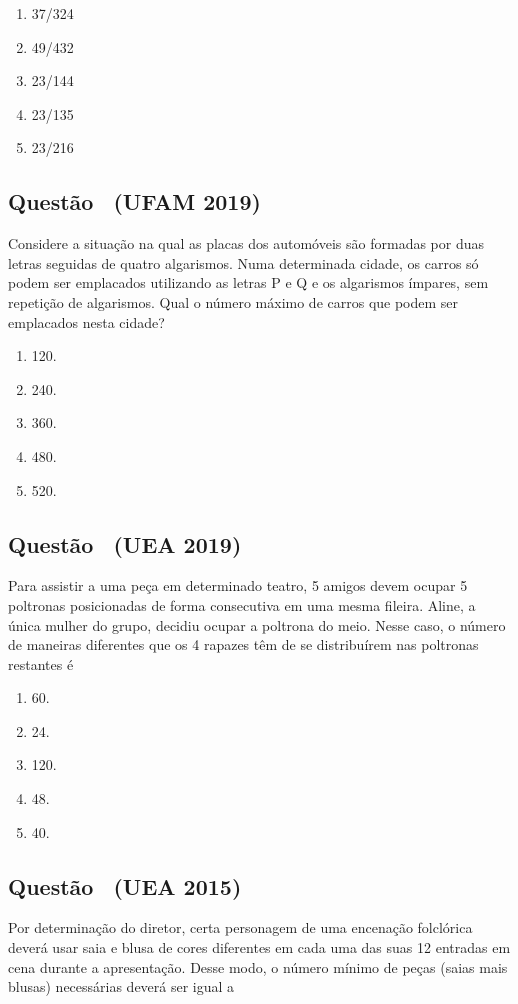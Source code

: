 \documentclass[12pt]{article}
\newcounter{questao}
\newcommand{\novaquestao}[1]{%
	\stepcounter{questao}%
	\subsection*{Questão \thequestao\ (#1)}%
}
\begin{document}
\begin{multicols}{2}
			\begin{enumerate}[label=(\alph*), noitemsep]
				\item {37}/{324}
				\item {49}/{432}
				\item {23}/{144}
				\item {23}/{135}
				\item {23}/{216}
			\end{enumerate}

   \novaquestao{UFAM 2019}

            Considere a situação na qual as placas dos automóveis são formadas por duas letras seguidas de quatro algarismos. Numa determinada cidade, os carros só podem ser emplacados utilizando as letras P e Q e os algarismos ímpares, sem repetição de algarismos. Qual o número máximo de carros que podem ser emplacados nesta cidade?

                \begin{enumerate}[label=(\alph*), noitemsep]
	                \item 120.
	                \item 240.
	                \item 360.
	                \item 480.
	                \item 520.
                \end{enumerate}

            \novaquestao{UEA 2019}

            Para assistir a uma peça em determinado teatro, 5 amigos devem ocupar 5 poltronas posicionadas de forma consecutiva em uma mesma fileira. Aline, a única mulher do grupo, decidiu ocupar a poltrona do meio. Nesse caso, o número de maneiras diferentes que os 4 rapazes têm de se distribuírem nas poltronas restantes é 

                \begin{enumerate}[label=(\alph*), noitemsep]
	                \item 60.
	                \item 24.
	                \item 120.
	                \item 48.
	                \item 40.
                \end{enumerate}

            \novaquestao{UEA 2015}

            Por determinação do diretor, certa personagem de uma encenação folclórica deverá usar saia e blusa de cores diferentes em cada uma das suas 12 entradas em cena durante a apresentação. Desse modo, o número mínimo de peças (saias mais blusas) necessárias deverá ser igual a 


\end{multicols}
\end{document}
